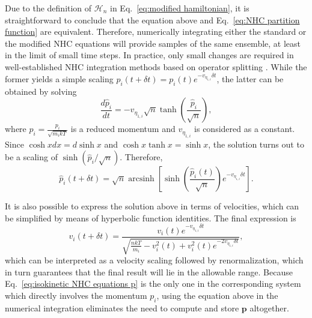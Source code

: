 \documentclass[
aip,
jcp,
reprint,
]{revtex4-1}
\DeclareMathOperator\arcsinh{arcsinh}
\newcommand{\vt}[1]{\boldsymbol{\mathbf{#1}}}          %
\newcommand{\diff}[2]{\frac{\partial #2}{\partial #1}} %
\newcommand{\timestep}{h}
\begin{document}
Due to the definition of $\mathcal{H}_n$ in Eq.~\eqref{eq:modified hamiltonian}, it is straightforward to conclude that the equation above and Eq.~\eqref{eq:NHC partition function} are equivalent.
Therefore, numerically integrating either the standard or the modified NHC equations will provide samples of the same ensemble, at least in the limit of small time steps.
In practice, only small changes are required in well-established NHC integration methods based on operator splitting \cite{Martyna_1996, Tuckerman_2010}.
While the former yields a simple scaling $p_i(t+\delta t) = p_i(t) e^{-v_{\eta_{1,i}} \delta t}$, the latter can be obtained by solving
\begin{equation}
\frac{d \hat{p}_i}{d t} = - v_{\eta_{1,i}} \sqrt{n} \tanh\left(\frac{\hat{p}_i}{\sqrt{n}}\right),
\end{equation}
where $\hat{p}_i = \frac{p_i}{\sqrt{m_i kT}}$ is a reduced momentum and $v_{\eta_{1,i}}$ is considered as a constant.
Since $\cosh x dx = d \sinh x$ and $\cosh x \tanh x = \sinh x$, the solution turns out to be a scaling of $\sinh\left({\hat{p}_i}/{\sqrt{n}}\right)$.
Therefore,
\begin{equation*}
\hat{p}_i(t+\delta t) = \sqrt{n} \arcsinh\left[\sinh \left(\frac{\hat{p}_i(t)}{\sqrt{n}}\right) e^{-v_{\eta_{1,i}} \delta t}\right].
\end{equation*}

It is also possible to express the solution above in terms of velocities, which can be simplified by means of hyperbolic function identities.
The final expression is
\begin{equation}
v_i(t+\delta t) = \frac{v_i(t) e^{-v_{\eta_{1,i}} \delta t}}{\sqrt{\frac{n kT}{m_i} - v_{i}^2(t) + v_i^2(t) e^{-2 v_{\eta_{1,i}} \delta t}}},
\end{equation}
which can be interpreted as a velocity scaling followed by renormalization, which in turn guarantees that the final result will lie in the allowable range.
Because Eq.~\eqref{eq:isokinetic NHC equations p} is the only one in the corresponding system which directly involves the momentum $p_i$, using the equation above in the numerical integration eliminates the need to compute and store $\vt p$ altogether.
\end{document}
